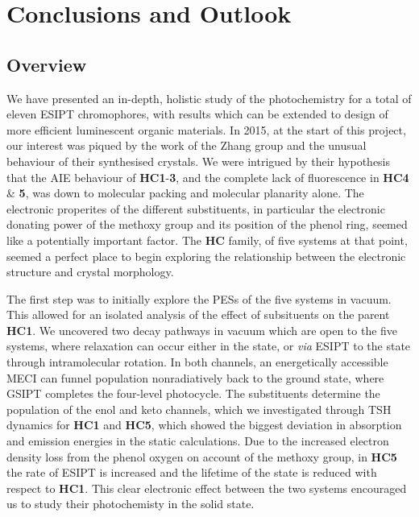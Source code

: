 \chapter{Conclusions and Outlook}
\label{chapter: Conclusions}
\section{Overview}\label{section: conclusions_overview}
We have presented an in-depth, holistic study of the photochemistry for a total of eleven ESIPT chromophores, with results which can be extended to design of more efficient luminescent organic materials. In 2015, at the start of this project, our interest was piqued by the work of the Zhang group and the unusual behaviour of their synthesised crystals.\cite{Cheng2015} We were intrigued by their hypothesis that the AIE behaviour of \textbf{HC1}-\textbf{3}, and the complete lack of fluorescence in \textbf{HC4} \& \textbf{5}, was down to molecular packing and molecular planarity alone. The electronic properites of the different substituents, in particular the electronic donating power of the methoxy group and its position of the phenol ring, seemed like a potentially important factor. The \textbf{HC} family, of five systems at that point, seemed a perfect place to begin exploring the relationship between the electronic structure and crystal morphology.

The first step was to initially explore the \acp{PES} of the five systems in vacuum. This allowed for an isolated analysis of the effect of subsituents on the parent \textbf{HC1}. We uncovered two decay pathways in vacuum which are open to the five systems, where relaxation can occur either in the \Estar{} state, or \textit{via} ESIPT to the \Kstar{} state through intramolecular rotation. In both channels, an energetically accessible \ac{MECI} can funnel population nonradiatively back to the ground state, where \ac{GSIPT} completes the four-level photocycle. The substituents determine the population of the enol and keto channels, which we investigated through \ac{TSH} dynamics for \textbf{HC1} and \textbf{HC5}, which showed the biggest deviation in absorption and emission energies in the static calculations. Due to the increased electron density loss from the phenol oxygen on account of the methoxy group, in \textbf{HC5} the rate of ESIPT is increased and the lifetime of the \Kstar{} state is reduced with respect to \textbf{HC1}. This clear electronic effect between the two systems encouraged us to study their photochemisty in the solid state.

